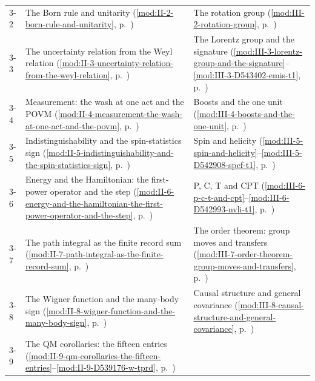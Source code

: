 {\begin{longtable}{p{11mm}p{70mm}p{60mm}}
3-2 & The Born rule and unitarity (\ref{mod:II-2-born-rule-and-unitarity}, p.~\pageref{mod:II-2-born-rule-and-unitarity}) & The rotation group (\ref{mod:III-2-rotation-group}, p.~\pageref{mod:III-2-rotation-group}) \\
3-3 & The uncertainty relation from the Weyl relation (\ref{mod:II-3-uncertainty-relation-from-the-weyl-relation}, p.~\pageref{mod:II-3-uncertainty-relation-from-the-weyl-relation}) & The Lorentz group and the signature (\ref{mod:III-3-lorentz-group-and-the-signature}--\ref{mod:III-3-D543402-emis-t1}, p.~\pageref{mod:III-3-lorentz-group-and-the-signature}) \\
3-4 & Measurement: the wash at one act and the POVM (\ref{mod:II-4-measurement-the-wash-at-one-act-and-the-povm}, p.~\pageref{mod:II-4-measurement-the-wash-at-one-act-and-the-povm}) & Boosts and the one unit (\ref{mod:III-4-boosts-and-the-one-unit}, p.~\pageref{mod:III-4-boosts-and-the-one-unit}) \\
3-5 & Indistinguishability and the spin-statistics sign (\ref{mod:II-5-indistinguishability-and-the-spin-statistics-sign}, p.~\pageref{mod:II-5-indistinguishability-and-the-spin-statistics-sign}) & Spin and helicity (\ref{mod:III-5-spin-and-helicity}--\ref{mod:III-5-D542908-spcf-t1}, p.~\pageref{mod:III-5-spin-and-helicity}) \\
3-6 & Energy and the Hamiltonian: the first-power operator and the step (\ref{mod:II-6-energy-and-the-hamiltonian-the-first-power-operator-and-the-step}, p.~\pageref{mod:II-6-energy-and-the-hamiltonian-the-first-power-operator-and-the-step}) & P, C, T and CPT (\ref{mod:III-6-p-c-t-and-cpt}--\ref{mod:III-6-D542993-nvli-t1}, p.~\pageref{mod:III-6-p-c-t-and-cpt}) \\
3-7 & The path integral as the finite record sum (\ref{mod:II-7-path-integral-as-the-finite-record-sum}, p.~\pageref{mod:II-7-path-integral-as-the-finite-record-sum}) & The order theorem: group moves and transfers (\ref{mod:III-7-order-theorem-group-moves-and-transfers}, p.~\pageref{mod:III-7-order-theorem-group-moves-and-transfers}) \\
3-8 & The Wigner function and the many-body sign (\ref{mod:II-8-wigner-function-and-the-many-body-sign}, p.~\pageref{mod:II-8-wigner-function-and-the-many-body-sign}) & Causal structure and general covariance (\ref{mod:III-8-causal-structure-and-general-covariance}, p.~\pageref{mod:III-8-causal-structure-and-general-covariance}) \\
3-9 & The QM corollaries: the fifteen entries (\ref{mod:II-9-qm-corollaries-the-fifteen-entries}--\ref{mod:II-9-D539176-w-tprd}, p.~\pageref{mod:II-9-qm-corollaries-the-fifteen-entries}) &  \\

\end{longtable}}

